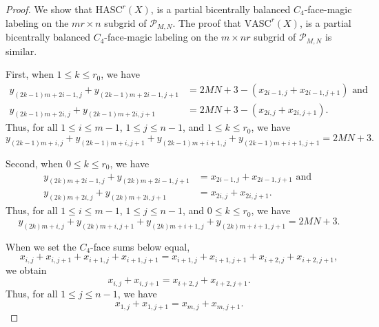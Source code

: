 \documentclass[12pt]{amsart}
\theoremstyle{definition}
\theoremstyle{plain}
\begin{document}
\begin{proof}
  We show that $\mathrm{HASC}^r(X)$, is a partial  bicentrally balanced $C_4$-face-magic labeling on the $mr \times n$ subgrid of $\mathcal{P}_{M,N}$.
  The proof that $\mathrm{VASC}^r(X)$, is a partial  bicentrally balanced $C_4$-face-magic labeling on the $m \times nr$ subgrid of $\mathcal{P}_{M,N}$ is similar.

  First, when $1\leqslant k \leqslant r_0$, we have
  \begin{align*}
    y_{(2k-1)m+2i-1,j} + y_{(2k-1)m+2i-1,j+1}   &=   2MN+3 -( x_{2i-1,j} + x_{2i-1,j+1} ) \mbox{ and } \\
    y_{(2k-1)m+2i,j} + y_{(2k-1)m+2i,j+1}       &=    2MN+3 -( x_{2i,j} + x_{2i,j+1} ).
  \end{align*}
  Thus, for all $1\leqslant i \leqslant m-1$, $1\leqslant j \leqslant n-1$, and $1\leqslant k \leqslant r_0$, we have
  \begin{equation*}
    y_{(2k-1)m+i,j} + y_{(2k-1)m+i,j+1} + y_{(2k-1)m+i+1,j} + y_{(2k-1)m+i+1,j+1} = 2MN+3.
  \end{equation*}

  Second, when $0\leqslant k \leqslant r_0$, we have
  \begin{align*}
    y_{(2k)m+2i-1,j} + y_{(2k)m+2i-1,j+1}   &=   x_{2i-1,j} + x_{2i-1,j+1}  \mbox{ and } \\
    y_{(2k)m+2i,j} + y_{(2k)m+2i,j+1}       &=    x_{2i,j} + x_{2i,j+1}.
  \end{align*}
  Thus, for all $1\leqslant i \leqslant m-1$, $1\leqslant j \leqslant n-1$, and $0\leqslant k \leqslant r_0$, we have
  \begin{equation*}
    y_{(2k)m+i,j} + y_{(2k)m+i,j+1} + y_{(2k)m+i+1,j} + y_{(2k)m+i+1,j+1} = 2MN+3.
  \end{equation*}

  When we set the $C_4$-face sums below equal,
  \begin{equation*}
    x_{i,j} + x_{i,j+1} + x_{i+1,j} + x_{i+1,j+1} = x_{i+1,j} + x_{i+1,j+1} + x_{i+2,j} + x_{i+2,j+1},
  \end{equation*}
  we obtain
  \begin{equation*}
    x_{i,j} + x_{i,j+1}  =  x_{i+2,j} + x_{i+2,j+1}.
  \end{equation*}
  Thus, for all $1 \leqslant j \leqslant n-1$, we have
  \begin{equation} \label{eqnOneSideSumEqualsOtherSide}
    x_{1,j} + x_{1,j+1}  =  x_{m,j} + x_{m,j+1}.
  \end{equation}


\end{proof}
\end{document}
